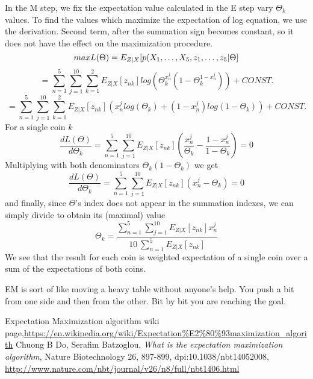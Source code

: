 \documentclass[11pt]{article}
\theoremstyle{plain}
\theoremstyle{definition}
\begin{document}
In the M step, we fix the expectation value calculated in the E step vary $\Theta_k$ values. To find the values which maximize the expectation of log equation, we use the derivation. Second term, after the summation sign becomes constant, so it does not have the effect on the maximization procedure.
\begin{equation}
maxL(\Theta)=E_{Z|X}[p(X_1,\dots, X_5,\boldmath{z_1,\dots,z_5}|\Theta]
\end{equation}
\begin{equation}
=\sum_{n=1}^{5}\sum_{j=1}^{10}\sum_{k=1}^{2}E_{Z|X}[z_{nk}]log(\Theta_k^{x_n^j}(1-\Theta_k^{1-x_n^j}))+CONST.
\end{equation}
\begin{equation}
=\sum_{n=1}^{5}\sum_{j=1}^{10}\sum_{k=1}^{2}E_{Z|X}[z_{nk}]({x_n^j}log(\Theta_k)+({1-x_n^j})log(1-\Theta_k))+CONST.
\end{equation}
For a single coin $k$
\begin{equation}
\frac{dL(\Theta)}{d\Theta_k}=\sum_{n=1}^{5}\sum_{j=1}^{10}E_{Z|X}[z_{nk}](\frac{x_n^j}{\Theta_k}-\frac{1-x_n^j}{1-\Theta_k})=0
\end{equation}
Multiplying with both denominators $\Theta_k(1-\Theta_k)$ we get
\begin{equation}
\frac{dL(\Theta)}{d\Theta_k}=\sum_{n=1}^{5}\sum_{j=1}^{10}E_{Z|X}[z_{nk}]({x_n^j}-{\Theta_k})=0
\end{equation}
and finally, since $\Theta$'s index does not appear in the summation indexes, we can simply divide to obtain its (maximal) value
\begin{equation}
\Theta_k=\frac{\sum_{n=1}^{5}\sum_{j=1}^{10}E_{Z|X}[z_{nk}]{x_n^j}}{10\:\sum_{n=1}^{5}E_{Z|X}[z_{nk}]}
\end{equation}
We see that the result for each coin is weighted expectation of a single coin over a sum of the expectations of both coins.

EM is sort of like moving a heavy table without anyone's help. You push a bit from one side and then from the other. Bit by bit you are reaching the goal.
\begin{thebibliography}{} 
 Expectation Maximization algorithm wiki page,\url{https://en.wikipedia.org/wiki/Expectation%E2%80%93maximization_algorith}
 Chuong B Do,  Serafim Batzoglou, \emph{What is the expectation maximization algorithm}, Nature Biotechnology 26, 897-899, dpi:10.1038/nbt14052008, \url{http://www.nature.com/nbt/journal/v26/n8/full/nbt1406.html}

\end{thebibliography}
\end{document}
